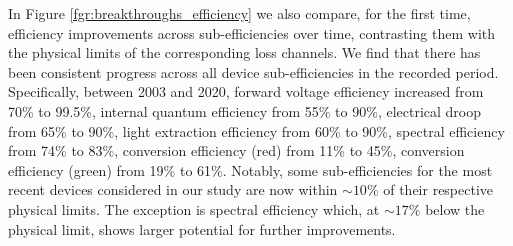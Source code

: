 \documentclass[journal=jacsat,manuscript=article]{achemso}
\begin{document}
In Figure \ref{fgr:breakthroughs_efficiency} we also compare, for the first time, efficiency improvements across sub-efficiencies over time, contrasting them with the physical limits of the corresponding loss channels. We find that there has been consistent progress across all device sub-efficiencies in the recorded period. Specifically, between 2003 and 2020, forward voltage efficiency increased from 70\% to 99.5\%, internal quantum efficiency from 55\% to 90\%, electrical droop from 65\% to 90\%, light extraction efficiency from 60\% to 90\%, spectral efficiency from 74\% to 83\%, conversion efficiency (red) from 11\% to 45\%, conversion efficiency (green) from 19\% to 61\%. Notably, some sub-efficiencies for the most recent devices considered in our study are now within $\sim10\%$ of their respective physical limits. The exception is spectral efficiency which, at $\sim17\%$ below the physical limit, shows larger potential for further improvements.
\end{document}
